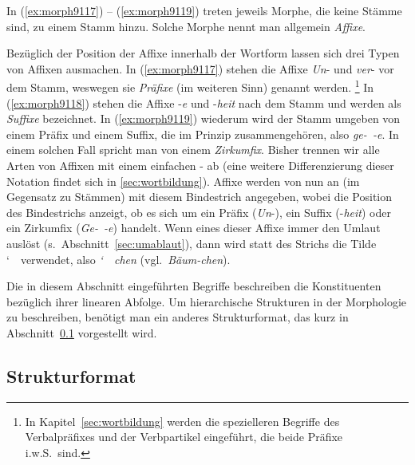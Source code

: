 In (\ref{ex:morph9117}) -- (\ref{ex:morph9119}) treten jeweils Morphe, die keine Stämme sind, zu einem Stamm hinzu.
Solche Morphe nennt man allgemein \textit{Affixe}.



Bezüglich der Position der Affixe innerhalb der Wortform lassen sich drei Typen von Affixen ausmachen.
In (\ref{ex:morph9117}) stehen die Affixe \textit{Un}- und \textit{ver}- vor dem Stamm, weswegen sie \textit{Präfixe} (im weiteren Sinn) genannt werden.%
\footnote{In Kapitel~\ref{sec:wortbildung} werden die spezielleren Begriffe des Verbalpräfixes und der Verbpartikel eingeführt, die beide Präfixe i.w.S.\ sind.}
In (\ref{ex:morph9118}) stehen die Affixe -\textit{e} und -\textit{heit} nach dem Stamm und werden als \textit{Suffixe} bezeichnet.
In (\ref{ex:morph9119}) wiederum wird der Stamm umgeben von einem Präfix und einem Suffix, die im Prinzip zusammengehören, also \textit{ge-~-e}.
In einem solchen Fall spricht man von einem \textit{Zirkumfix}.
Bisher trennen wir alle Arten von Affixen mit einem einfachen - ab (eine weitere Differenzierung dieser Notation findet sich in \ref{sec:wortbildung}).
Affixe werden von nun an (im Gegensatz zu Stämmen) mit diesem Bindestrich angegeben, wobei die Position des Bindestrichs anzeigt, ob es sich um ein Präfix (\textit{Un}-), ein Suffix (-\textit{heit}) oder ein Zirkumfix (\textit{Ge-~-e}) handelt.
Wenn eines dieser Affixe immer den Umlaut auslöst (s.\ Abschnitt~\ref{sec:umablaut}), dann wird statt des Strichs die Tilde \char`~\ verwendet, also \zB \mbox{\textit{\char`~ chen}} (vgl.\ \textit{Bäum-chen}).

Die in diesem Abschnitt eingeführten Begriffe beschreiben die Konstituenten bezüglich ihrer linearen Abfolge.
Um hierarchische Strukturen in der Morphologie zu beschreiben, benötigt man ein anderes Strukturformat, das kurz in Abschnitt~\ref{sec:morphstrukform} vorgestellt wird.

\subsection{Strukturformat}

\label{sec:morphstrukform}

